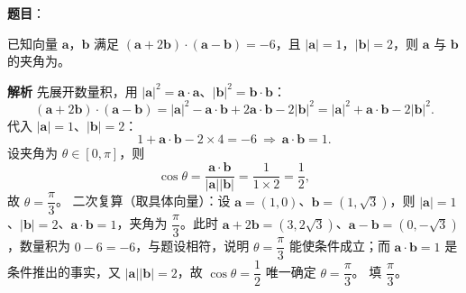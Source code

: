 \begin{answer}

\textbf{题目}：

已知向量 $\boldsymbol a$，$\boldsymbol b$ 满足 $(\boldsymbol a+2\boldsymbol b)\cdot(\boldsymbol a-\boldsymbol b)=-6$，且 $|\boldsymbol a|=1$，$|\boldsymbol b|=2$，则 $\boldsymbol a$ 与 $\boldsymbol b$ 的夹角为\gkblank{}。

\textbf{解析}
先展开数量积，用 $|\boldsymbol a|^2=\boldsymbol a\cdot\boldsymbol a$、$|\boldsymbol b|^2=\boldsymbol b\cdot\boldsymbol b$：
\nopagebreak[4]
\[
(\boldsymbol a+2\boldsymbol b)\cdot(\boldsymbol a-\boldsymbol b)=|\boldsymbol a|^2-\boldsymbol a\cdot\boldsymbol b+2\boldsymbol a\cdot\boldsymbol b-2|\boldsymbol b|^2=|\boldsymbol a|^2+\boldsymbol a\cdot\boldsymbol b-2|\boldsymbol b|^2.
\]
代入 $|\boldsymbol a|=1$、$|\boldsymbol b|=2$：
\nopagebreak[4]
\[
1+\boldsymbol a\cdot\boldsymbol b-2\times4=-6\ \Longrightarrow\ \boldsymbol a\cdot\boldsymbol b=1.
\]
设夹角为 $\theta\in[0,\pi]$，则
\nopagebreak[4]
\[
\cos\theta=\frac{\boldsymbol a\cdot\boldsymbol b}{|\boldsymbol a||\boldsymbol b|}=\frac{1}{1\times2}=\frac12,
\]
故 $\theta=\dfrac{\pi}{3}$。
二次复算（取具体向量）：设 $\boldsymbol a=(1,0)$、$\boldsymbol b=(1,\sqrt3)$，则 $|\boldsymbol a|=1$、$|\boldsymbol b|=2$、$\boldsymbol a\cdot\boldsymbol b=1$，夹角为 $\dfrac{\pi}{3}$。此时 $\boldsymbol a+2\boldsymbol b=(3,2\sqrt3)$、$\boldsymbol a-\boldsymbol b=(0,-\sqrt3)$，数量积为 $0-6=-6$，与题设相符，说明 $\theta=\dfrac{\pi}{3}$ 能使条件成立；而 $\boldsymbol a\cdot\boldsymbol b=1$ 是条件推出的事实，又 $|\boldsymbol a||\boldsymbol b|=2$，故 $\cos\theta=\dfrac12$ 唯一确定 $\theta=\dfrac{\pi}{3}$。
填 $\dfrac{\pi}{3}$。


\end{answer}
